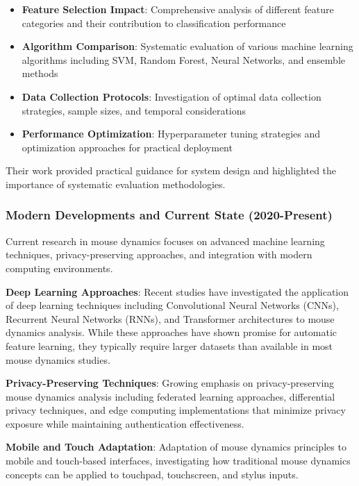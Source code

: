 \documentclass[
  12pt,
  a4paper,
]{report}
\providecommand{\tightlist}{%
  \setlength{\itemsep}{0pt}\setlength{\parskip}{0pt}}
\begin{document}
\begin{itemize}
\tightlist
\item
  \textbf{Feature Selection Impact}: Comprehensive analysis of different
  feature categories and their contribution to classification
  performance
\item
  \textbf{Algorithm Comparison}: Systematic evaluation of various
  machine learning algorithms including SVM, Random Forest, Neural
  Networks, and ensemble methods
\item
  \textbf{Data Collection Protocols}: Investigation of optimal data
  collection strategies, sample sizes, and temporal considerations
\item
  \textbf{Performance Optimization}: Hyperparameter tuning strategies
  and optimization approaches for practical deployment
\end{itemize}

Their work provided practical guidance for system design and highlighted
the importance of systematic evaluation methodologies.

\subsubsection{Modern Developments and Current State
(2020-Present)}\label{modern-developments-and-current-state-2020-present}

Current research in mouse dynamics focuses on advanced machine learning
techniques, privacy-preserving approaches, and integration with modern
computing environments.

\textbf{Deep Learning Approaches}: Recent studies have investigated the
application of deep learning techniques including Convolutional Neural
Networks (CNNs), Recurrent Neural Networks (RNNs), and Transformer
architectures to mouse dynamics analysis. While these approaches have
shown promise for automatic feature learning, they typically require
larger datasets than available in most mouse dynamics studies.

\textbf{Privacy-Preserving Techniques}: Growing emphasis on
privacy-preserving mouse dynamics analysis including federated learning
approaches, differential privacy techniques, and edge computing
implementations that minimize privacy exposure while maintaining
authentication effectiveness.

\textbf{Mobile and Touch Adaptation}: Adaptation of mouse dynamics
principles to mobile and touch-based interfaces, investigating how
traditional mouse dynamics concepts can be applied to touchpad,
touchscreen, and stylus inputs.
\end{document}
